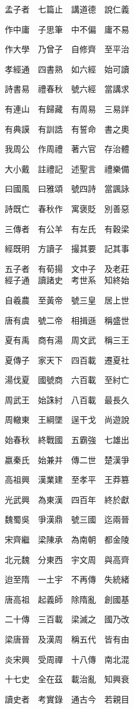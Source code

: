 \documentclass[a4paper,twocolumn]{article}
\begin{document}
\begin{Large}
孟子者　七篇止　講道德　說仁義

作中庸　子思筆　中不偏　庸不易

作大學　乃曾子　自修齊　至平治

孝經通　四書熟　如六經　始可讀

詩書易　禮春秋　號六經　當講求

有連山　有歸藏　有周易　三易詳

有典謨　有訓誥　有誓命　書之奧

我周公　作周禮　著六官　存治體

大小戴　註禮記　述聖言　禮樂備

曰國風　曰雅頌　號四詩　當諷詠

詩既亡　春秋作　寓褒貶　別善惡

三傳者　有公羊　有左氏　有穀梁

經既明　方讀子　撮其要　記其事

五子者　有荀揚　文中子　及老莊
\\

經子通　讀諸史　考世系　知終始

自羲農　至黃帝　號三皇　居上世

唐有虞　號二帝　相揖遜　稱盛世

夏有禹　商有湯　周文武　稱三王

夏傳子　家天下　四百載　遷夏社

湯伐夏　國號商　六百載　至紂亡

周武王　始誅紂　八百載　最長久

周轍東　王綱墜　逞干戈　尚遊說

始春秋　終戰國　五霸強　七雄出

嬴秦氏　始兼并　傳二世　楚漢爭

高祖興　漢業建　至孝平　王莽篡

光武興　為東漢　四百年　終於獻

魏蜀吳　爭漢鼎　號三國　迄兩晉

宋齊繼　梁陳承　為南朝　都金陵

北元魏　分東西　宇文周　與高齊

迨至隋　一土宇　不再傳　失統緒

唐高祖　起義師　除隋亂　創國基

二十傳　三百載　梁滅之　國乃改

梁唐晉　及漢周　稱五代　皆有由

炎宋興　受周禪　十八傳　南北混

十七史　全在茲　載治亂　知興衰

讀史者　考實錄　通古今　若親目


\end{Large}
\end{document}
